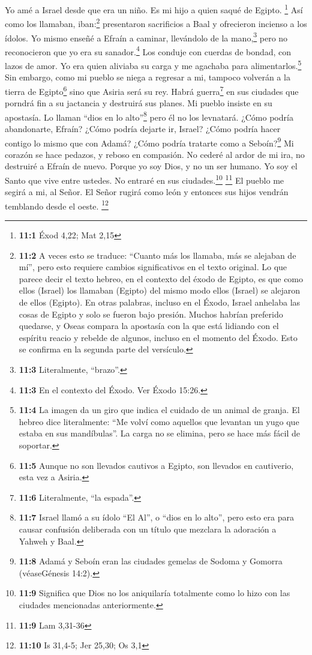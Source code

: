  Yo amé a Israel desde que era un niño. Es mi hijo a quien
saqué de Egipto. \footnote{\textbf{11:1} Éxod 4,22; Mat 2,15}
 Así como los llamaban, iban:\footnote{\textbf{11:2} A
  veces esto se traduce: ``Cuanto más los llamaba, más se alejaban de
  mí'', pero esto requiere cambios significativos en el texto original.
  Lo que parece decir el texto hebreo, en el contexto del éxodo de
  Egipto, es que como ellos (Israel) los llamaban (Egipto) del mismo
  modo ellos (Israel) se alejaron de ellos (Egipto). En otras palabras,
  incluso en el Éxodo, Israel anhelaba las cosas de Egipto y solo se
  fueron bajo presión. Muchos habrían preferido quedarse, y Oseas
  compara la apostasía con la que está lidiando con el espíritu reacio y
  rebelde de algunos, incluso en el momento del Éxodo. Esto se confirma
  en la segunda parte del versículo.} presentaron sacrificios a Baal y
ofrecieron incienso a los ídolos.  Yo mismo enseñé a
Efraín a caminar, llevándolo de la mano,\footnote{\textbf{11:3}
  Literalmente, ``brazo''.} pero no reconocieron que yo era su
sanador.\footnote{\textbf{11:3} En el contexto del Éxodo. Ver Éxodo
  15:26.}  Los conduje con cuerdas de bondad, con lazos de
amor. Yo era quien aliviaba su carga y me agachaba para
alimentarlos.\footnote{\textbf{11:4} La imagen da un giro que indica el
  cuidado de un animal de granja. El hebreo dice literalmente: ``Me
  volví como aquellos que levantan un yugo que estaba en sus
  mandíbulas''. La carga no se elimina, pero se hace más fácil de
  soportar.}  Sin embargo, como mi pueblo se niega a
regresar a mi, tampoco volverán a la tierra de Egipto\footnote{\textbf{11:5}
  Aunque no son llevados cautivos a Egipto, son llevados en cautiverio,
  esta vez a Asiria.} sino que Asiria será su rey.  Habrá
guerra\footnote{\textbf{11:6} Literalmente, ``la espada''.} en sus
ciudades que porndrá fin a su jactancia y destruirá sus planes.
 Mi pueblo insiste en su apostasía. Lo llaman ``dios en lo
alto''\footnote{\textbf{11:7} Israel llamó a su ídolo ``El Al'', o
  ``dios en lo alto'', pero esto era para causar confusión deliberada
  con un título que mezclara la adoración a Yahweh y Baal.} pero él no
los levnatará.  ¿Cómo podría abandonarte, Efraín? ¿Cómo
podría dejarte ir, Israel? ¿Cómo podría hacer contigo lo mismo que con
Adamá? ¿Cómo podría tratarte como a Seboín?\footnote{\textbf{11:8} Adamá
  y Seboín eran las ciudades gemelas de Sodoma y Gomorra (véaseGénesis
  14:2).} Mi corazón se hace pedazos, y reboso en compasión.
 No cederé al ardor de mi ira, no destruiré a Efraín de
nuevo. Porque yo soy Dios, y no un ser humano. Yo soy el Santo que vive
entre ustedes. No entraré en sus ciudades.\footnote{\textbf{11:9}
  Significa que Dios no los aniquilaría totalmente como lo hizo con las
  ciudades mencionadas anteriormente.} \footnote{\textbf{11:9} Lam
  3,31-36}  El pueblo me segirá a mi, al Señor. El Señor
rugirá como león y entonces sus hijos vendrán temblando desde el oeste.
\footnote{\textbf{11:10} Is 31,4-5; Jer 25,30; Os 3,1}

